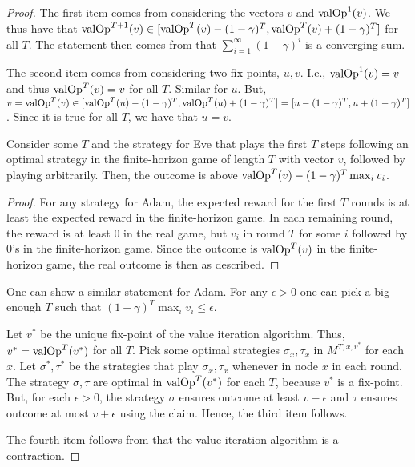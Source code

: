 \begin{proof}
The first item comes from considering the vectors $v$ and $\text{valOp}^1(v)$. We thus have that $\text{valOp}^{T+1}(v)\in [\text{valOp}^{T}(v)-(1-\gamma)^T,\text{valOp}^{T}(v)+(1-\gamma)^T]$ for all $T$. The statement then comes from that $\sum_{i=1}^\infty (1-\gamma)^i$ is a converging sum.

The second item comes from considering two fix-points, $u,v$. I.e., $\text{valOp}^1(v)=v$ and thus $\text{valOp}^T(v)=v$ for all $T$. Similar for $u$.
But, $v=\text{valOp}^T(v)\in [\text{valOp}^T(u)-(1-\gamma)^T, \text{valOp}^T(u)+(1-\gamma)^T]=[u-(1-\gamma)^T, u+(1-\gamma)^T]$. Since it is true for all $T$, we have that $u=v$.

\begin{claim}
 Consider some $T$ and the strategy for Eve that plays the first $T$ steps following an optimal strategy in the finite-horizon game of length $T$ with vector $v$, followed by playing arbitrarily. 
Then, the outcome is above $\text{valOp}^T(v)- (1-\gamma)^T\max_{i} v_i$.
\end{claim}
\begin{proof}
For any strategy for Adam, the expected reward for the first $T$ rounds is at least the expected reward in the finite-horizon game. In each remaining round, the reward is at least $0$ in the real game, but $v_i$ in round $T$ for some $i$ followed by 0's in the finite-horizon game.
Since the outcome is $\text{valOp}^T(v)$ in the finite-horizon game, the real outcome is then as described.
\end{proof}
One can show a similar statement for Adam.
For any $\epsilon>0$ one can pick a big enough $T$ such that $(1-\gamma)^T\max_{i} v_i\leq \epsilon$.


Let $v^*$ be the unique fix-point of the value iteration algorithm. 
Thus, $v^*=\text{valOp}^T(v^*)$ for all $T$. Pick some optimal strategies $\sigma_x,\tau_x$ in $M^{T,x,v^*}$ for each $x$. Let $\sigma^*,\tau^*$ be the strategies that play $\sigma_x,\tau_x$ whenever in node $x$ in each round.
The strategy $\sigma,\tau$ are optimal in $\text{valOp}^T(v^*)$ for each $T$, because $v^*$ is a fix-point. 
But, for each $\epsilon>0$,  the strategy $\sigma$ ensures outcome at least $v-\epsilon$ and $\tau$ ensures outcome at most $v+\epsilon$ using the claim. Hence, the third item follows.


The fourth item follows from that the value iteration algorithm is a contraction.


\end{proof}
